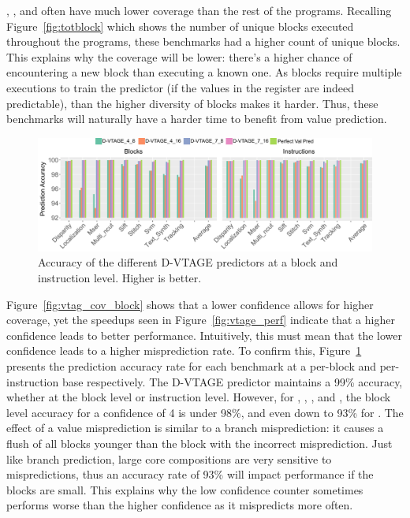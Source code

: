 , ,  and  often have much lower coverage than the rest of the programs.
Recalling Figure~\ref{fig:totblock} which shows the number of unique blocks executed throughout the programs, these benchmarks had a higher count of unique blocks.
This explains why the coverage will be lower: there's a higher chance of encountering a new block than executing a known one.
As blocks require multiple executions to train the predictor (if the values in the register are indeed predictable), than the higher diversity of blocks makes it harder.
Thus, these benchmarks will naturally have a harder time to benefit from value prediction.

\begin{figure}[t]
    \centering
    \includegraphics[width=1\textwidth]{chapter3/graphics/predAcc.pdf}
    \caption{Accuracy of the different D-VTAGE predictors at a block and instruction level. Higher is better.}
    \label{fig:vtag_accuracy_block}
	\vspace{1em}
\end{figure}

Figure~\ref{fig:vtag_cov_block} shows that a lower confidence allows for higher coverage, yet the speedups seen in Figure~\ref{fig:vtage_perf} indicate that a higher confidence leads to better performance.
Intuitively, this must mean that the lower confidence leads to a higher misprediction rate.
To confirm this, Figure~\ref{fig:vtag_accuracy_block} presents the prediction accuracy rate for each benchmark at a per-block and per-instruction base respectively.
The D-VTAGE predictor maintains a 99\% accuracy, whether at the block level or instruction level.
However, for , , ,  and , the block level accuracy for a confidence of 4 is under 98\%, and even down to 93\% for .
The effect of a value misprediction is similar to a branch misprediction: it causes a flush of all blocks younger than the block with the incorrect misprediction.
Just like branch prediction, large core compositions are very sensitive to mispredictions, thus an accuracy rate of 93\% will impact performance if the blocks are small.
This explains why the low confidence counter sometimes performs worse than the higher confidence as it mispredicts more often.

